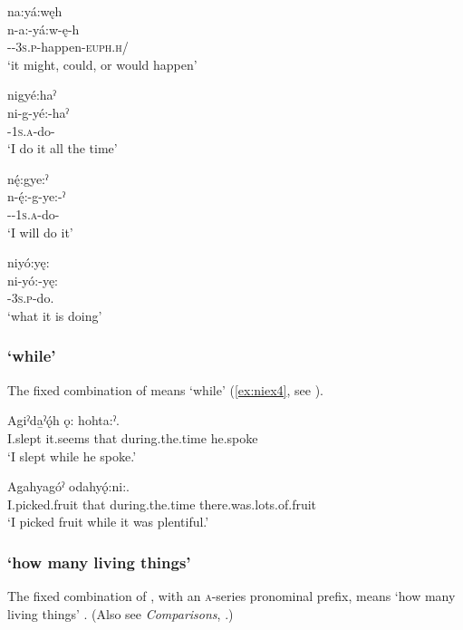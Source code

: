 \ex na:yá:węh\\
\gll n-a:-yá:w-ę-h\\
{\partitive}-{\indefinite}-\textsc{3s.p}-happen-\textsc{euph.h}/{\zeropunctual}\\
\glt `it might, could, or would happen'
\z

\ex nigyé:haˀ\\
\gll ni-g-yé:-haˀ\\
{\partitive}-\textsc{1s.a}-do-{\habitual}\\
\glt `I do it all the time'

\ea nę́:gye:ˀ\\
\gll n-ę́:-g-ye:-ˀ\\
{\partitive}-{\future}-\textsc{1s.a}-do-{\punctual}\\
\glt `I will do it'

\ex niyó:yę:\\
\gll ni-yó:-yę:\\
{\partitive}-\textsc{3s.p}-do.{\stative}\\
\glt `what it is doing'
\z
\z
\z

\subsubsection*{ ‘while’} \label{shęh naˀonisheˀ}

The fixed combination of  means ‘while’ (\ref{ex:niex4}, see ).

\ea\label{ex:niex4}
\ea
\gll Agiˀda̱ˀǫ́h ǫ:     hohta:ˀ. \\
I.slept it.seems that during.the.time he.spoke \\
\glt ‘I slept while he spoke.’ 

\ex
\gll Agahyagóˀ     odahyǫ́:ni:. \\
I.picked.fruit that during.the.time there.was.lots.of.fruit \\
\glt ‘I picked fruit while it was plentiful.’ 
\z
\z


\subsubsection*{ ‘how many living things’} \label{[ni-A-ǫ:]}
The fixed combination of , with an \textsc{a}-series pronominal prefix, means ‘how many living things’ . (Also see \textit{Comparisons}, .)

